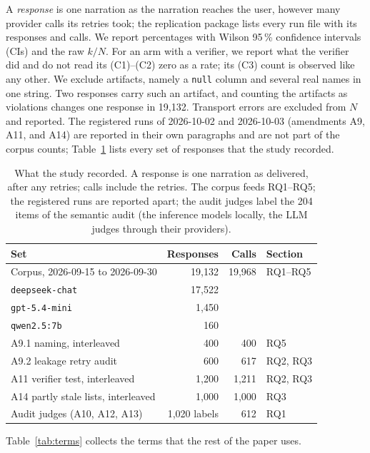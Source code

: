 \documentclass[10pt,twocolumn]{article}
\begin{document}
A \emph{response} is one narration as the narration reaches the user,
however many provider calls its retries took; the replication package lists every run file
with its responses and calls. We report percentages with Wilson 95\,\%
confidence intervals (CIs) and the raw $k/N$. For an arm with a verifier, we
report what the verifier did and do not read its (C1)--(C2) zero as a rate;
its (C3) count is observed like any other. We exclude artifacts, namely a
\texttt{null} column and several real names in one string. Two responses carry
such an artifact, and counting the artifacts as violations changes one
response in 19{,}132. Transport errors are excluded from $N$ and reported. The registered
runs of 2026-10-02 and 2026-10-03 (amendments A9, A11, and A14) are reported
in their own paragraphs and are not part of the corpus counts;
Table~\ref{tab:inventory} lists every set of responses that the study
recorded.

\begin{table}[!htbp]
\caption{What the study recorded. A response is one narration as delivered,
after any retries; calls include the retries. The corpus feeds RQ1--RQ5; the
registered runs are reported apart; the audit judges label the 204 items of
the semantic audit (the inference models locally, the LLM judges through
their providers).}
\label{tab:inventory}
\centering
\footnotesize
\setlength{\tabcolsep}{3pt}
\begin{tabular}{@{}lrrl@{}}
\toprule
Set & Responses & Calls & Section \\
\midrule
Corpus, 2026-09-15 to 2026-09-30 & 19{,}132 & 19{,}968 & RQ1--RQ5 \\
\quad \texttt{deepseek-chat} & 17{,}522 & & \\
\quad \texttt{gpt-5.4-mini} & 1{,}450 & & \\
\quad \texttt{qwen2.5:7b} & 160 & & \\
A9.1 naming, interleaved & 400 & 400 & RQ5 \\
A9.2 leakage retry audit & 600 & 617 & RQ2, RQ3 \\
A11 verifier test, interleaved & 1{,}200 & 1{,}211 & RQ2, RQ3 \\
A14 partly stale lists, interleaved & 1{,}000 & 1{,}000 & RQ3 \\
Audit judges (A10, A12, A13) & 1{,}020 labels & 612 & RQ1 \\
\bottomrule
\end{tabular}
\end{table}
Table~\ref{tab:terms} collects the terms that the rest of the paper uses.
\end{document}
